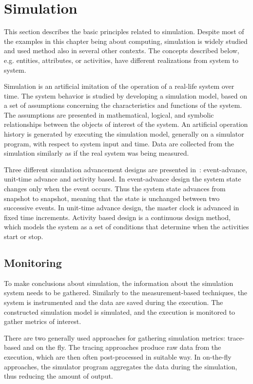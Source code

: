 \section{Simulation}
This section describes the basic principles related to simulation. Despite most of the examples in this chapter being about computing, simulation is widely studied and used method also in several other contexts. The concepts described below, e.g. entities, attributes, or activities, have different realizations from system to system.

Simulation is an artificial imitation of the operation of a real-life system over time. The system behavior is studied by developing a simulation model, based on a set of assumptions concerning the characteristics and functions of the system. The assumptions are presented in mathematical, logical, and symbolic relationships between the objects of interest of the system. An artificial operation history is generated by executing the simulation model, generally on a simulator program, with respect to system input and time. Data are collected from the simulation similarly as if the real system was being measured.

Three different simulation advancement designs are presented in~\cite{peros:2009:simulation}: event-advance, unit-time advance and activity based. In event-advance design the system state changes only when the event occurs. Thus the system state advances from snapshot to snapshot, meaning that the state is unchanged between two successive events. In unit-time advance design, the master clock is advanced in fixed time increments. Activity based design is a continuous design method, which models the system as a set of conditions that determine when the activities start or stop.~\cite{peros:2009:simulation}

\subsection{Monitoring}
To make conclusions about simulation, the information about the simulation system needs to be gathered. Similarly to the measurement-based techniques, the system is instrumented and the data are saved during the execution. The constructed simulation model is simulated, and the execution is monitored to gather metrics of interest.~\cite{jain:1991:AOCSPA, peros:2009:simulation}

There are two generally used approaches for gathering simulation metrics: trace-based and on the fly. The tracing approaches produce raw data from the execution, which are then often post-processed in suitable way. In on-the-fly approaches, the simulator program aggregates the data during the simulation, thus reducing the amount of output.~\cite{jain:1991:AOCSPA, peros:2009:simulation}


